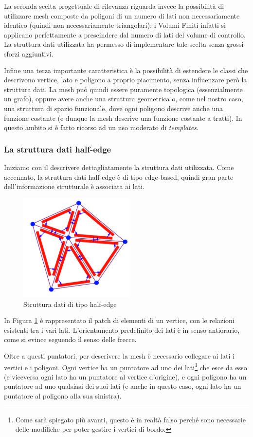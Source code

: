 La seconda scelta progettuale di rilevanza riguarda invece la possibilità di utilizzare mesh composte da poligoni di un numero di lati non necessariamente identico (quindi non necessariamente triangolari): i Volumi Finiti infatti si applicano perfettamente a prescindere dal numero di lati del volume di controllo. La struttura dati utilizzata ha permesso di implementare tale scelta senza grossi sforzi aggiuntivi.

Infine una terza importante caratteristica è la possibilità di estendere le classi che descrivono vertice, lato e poligono a proprio piacimento, senza influenzare però la struttura dati. La mesh può quindi essere puramente topologica (essenzialmente un grafo), oppure avere anche una struttura geometrica o, come nel nostro caso, una struttura di spazio funzionale, dove ogni poligono descrive anche una funzione costante (e dunque la mesh descrive una funzione costante a tratti). In questo ambito si è fatto ricorso ad un uso moderato di \emph{templates}.
\subsubsection{La struttura dati half-edge}
Iniziamo con il descrivere dettagliatamente la struttura dati utilizzata. Come accennato, la struttura dati half-edge è di tipo edge-based, quindi gran parte dell'informazione strutturale è associata ai lati.

\begin{figure}[htb]
\centering
\includegraphics[width=5.8cm]{images/halfedge.pdf}
\caption{Struttura dati di tipo half-edge} \label{fig:halfedge}
\end{figure}

In Figura \ref{fig:halfedge} è rappresentato il patch di elementi di un vertice, con le relazioni esistenti tra i vari lati. L'orientamento predefinito dei lati è in senso antiorario, come si evince seguendo il senso delle frecce.

Oltre a questi puntatori, per descrivere la mesh è necessario collegare ai lati i vertici e i poligoni. Ogni vertice ha un puntatore ad uno dei lati\footnote{Come sarà spiegato più avanti, questo è in realtà falso perché sono necessarie delle modifiche per poter gestire i vertici di bordo.} che esce da esso (e viceversa ogni lato ha un puntatore al vertice d'origine), e ogni poligono ha un puntatore ad uno qualsiasi dei suoi lati (e anche in questo caso, ogni lato ha un puntatore al poligono alla sua sinistra).

